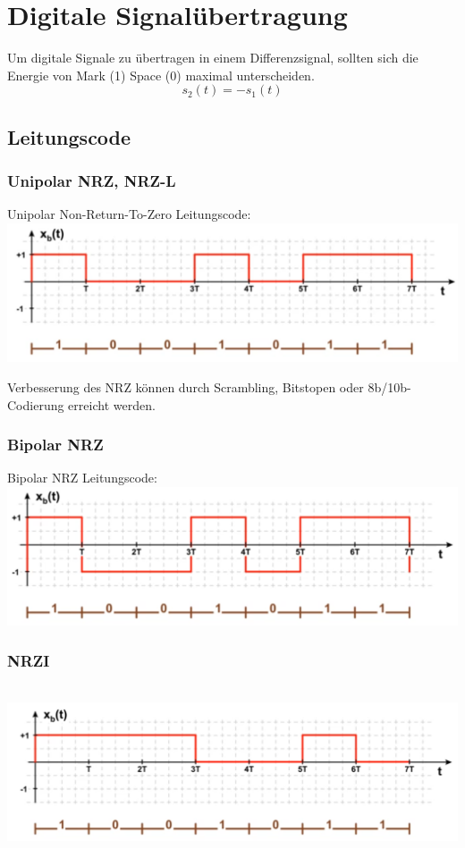 \section{Digitale Signalübertragung}
Um digitale Signale zu übertragen in einem Differenzsignal, sollten sich die Energie von Mark (1) Space (0) maximal unterscheiden.
\[
s_2(t) = -s_1(t)
\]

\subsection{Leitungscode}
\subsubsection{Unipolar NRZ, NRZ-L}
Unipolar Non-Return-To-Zero Leitungscode:\\
\includegraphics[width=0.6\columnwidth]{Images/nrz}

Verbesserung des NRZ können durch Scrambling, Bitstopen oder 8b/10b-Codierung erreicht werden.

\subsubsection{Bipolar NRZ}
Bipolar NRZ Leitungscode:\\
\includegraphics[width=0.6\columnwidth]{Images/nrz1}

\subsubsection{NRZI}\\
\includegraphics[width=0.6\columnwidth]{Images/nrzi}

